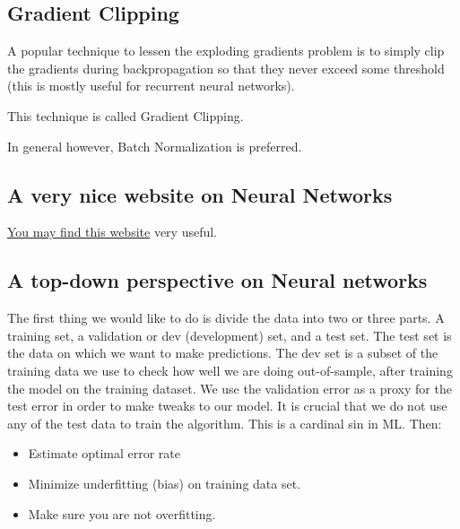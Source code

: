 \documentclass[%
oneside,                 %
final,                   %
10pt]{article}
\begin{document}
\subsection{Gradient Clipping}

A popular technique to lessen the exploding gradients problem is to
simply clip the gradients during backpropagation so that they never
exceed some threshold (this is mostly useful for recurrent neural
networks).

This technique is called Gradient Clipping.

In general however, Batch
Normalization is preferred.

\subsection{A very nice website on Neural Networks}

\href{{https://playground.tensorflow.org/#activation=tanh&batchSize=10&dataset=circle&regDataset=reg-plane&learningRate=0.03&regularizationRate=0&noise=0&networkShape=4,2&seed=0.29243&showTestData=false&discretize=false&percTrainData=50&x=true&y=true&xTimesY=false&xSquared=false&ySquared=false&cosX=false&sinX=false&cosY=false&sinY=false&collectStats=false&problem=classification&initZero=false&hideText=false}}{You may find this website} very useful. 

\subsection{A top-down perspective on Neural networks}

The first thing we would like to do is divide the data into two or
three parts. A training set, a validation or dev (development) set,
and a test set. The test set is the data on which we want to make
predictions. The dev set is a subset of the training data we use to
check how well we are doing out-of-sample, after training the model on
the training dataset. We use the validation error as a proxy for the
test error in order to make tweaks to our model. It is crucial that we
do not use any of the test data to train the algorithm. This is a
cardinal sin in ML. Then:

\begin{itemize}
\item Estimate optimal error rate

\item Minimize underfitting (bias) on training data set.

\item Make sure you are not overfitting.
\end{itemize}
\end{document}
